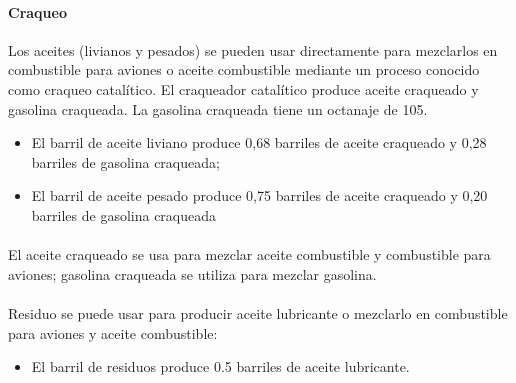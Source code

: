 \paragraph{Craqueo} 
Los aceites (livianos y pesados) se pueden usar directamente para mezclarlos en combustible para aviones o aceite combustible mediante un proceso conocido como craqueo catalítico. El craqueador catalítico produce aceite craqueado y gasolina craqueada. La gasolina craqueada tiene un octanaje de 105. 
\begin{itemize}
\item El barril de aceite liviano produce 0,68 barriles de aceite craqueado y 0,28 barriles de gasolina craqueada;
\item El barril de aceite pesado produce 0,75 barriles de aceite craqueado y 0,20 barriles de gasolina craqueada
\end{itemize} 
\paragraph{} El aceite craqueado se usa para mezclar aceite combustible y combustible para aviones; gasolina craqueada se utiliza para mezclar gasolina.
\paragraph{} Residuo se puede usar para producir aceite lubricante o mezclarlo en combustible para aviones y aceite combustible:
\begin{itemize}
\item El barril de residuos produce 0.5 barriles de aceite lubricante.
\end{itemize} 
